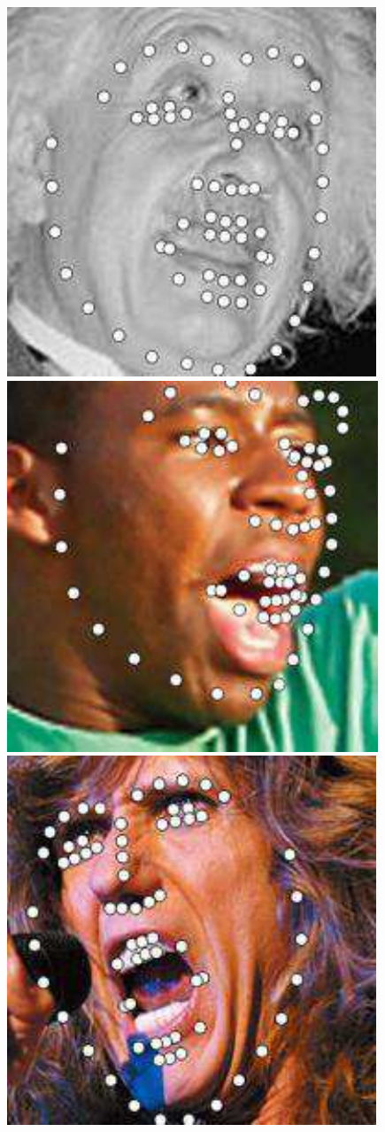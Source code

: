 \documentclass[journal]{IEEEtran}
\begin{document}
\begin{figure}[!htb]
\includegraphics[scale=0.22]{68_CFSS_image_040}
\includegraphics[scale=0.22]{68_CFSS_image_014_01}
\includegraphics[scale=0.22]{68_CFSS_image_086_1}

\end{figure}
\end{document}
